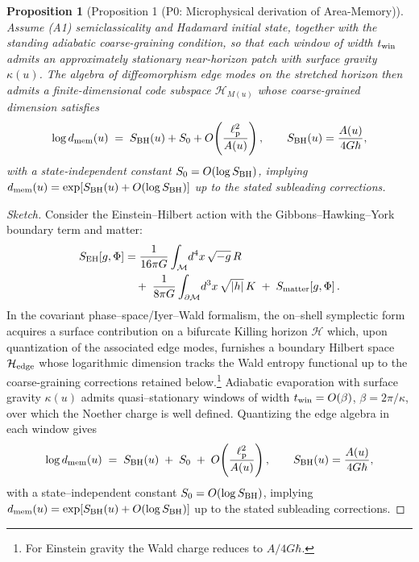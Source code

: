 \documentclass[a4paper,11pt]{article}
\theoremstyle{plain}
\newtheorem{proposition}{Proposition}
\theoremstyle{definition}
\theoremstyle{remark}
\begin{document}
\begin{proposition}[Proposition 1 (P0: Microphysical derivation of Area-Memory)]
\label{lem:P0-derivation}
\label{prop:P0-derivation}
Assume (A1) semiclassicality and Hadamard initial state, together with the standing adiabatic coarse-graining condition, so that each window of width $t_{\rm win}$
admits an approximately stationary near-horizon patch with surface gravity $\kappa(u)$. The algebra of diffeomorphism edge modes on
the stretched horizon then admits a finite-dimensional code subspace $\mathcal{H}_{M(u)}$ whose coarse-grained dimension satisfies
\[
\log d_{\rm mem}(u) \;=\; S_{\rm BH}(u) + S_0 + O\!\left(\frac{\ell_{\rm p}^2}{A(u)}\right),\qquad S_{\rm BH}(u)=\frac{A(u)}{4G\hbar},
\]
with a state-independent constant $S_0=O(\log S_{\rm BH})$, implying $d_{\rm mem}(u)=\exp[S_{\rm BH}(u)+O(\log S_{\rm BH})]$ up to the stated subleading corrections.
\end{proposition}
\begin{proof}[Sketch]
Consider the Einstein--Hilbert action with the Gibbons--Hawking--York boundary term and matter:
\begin{equation}
\begin{split}
S_{\rm EH}[g,\Phi] &= \frac{1}{16\pi G}\int_{\mathcal{M}}\!d^4x\,\sqrt{-g}\,R \\
  &\quad +\;\frac{1}{8\pi G}\int_{\partial\mathcal{M}}\!d^3x\,\sqrt{|h|}\,K\;+\;S_{\rm matter}[g,\Phi]\,.
\end{split}
\end{equation}
In the covariant phase--space/Iyer--Wald formalism, the on--shell symplectic form acquires a surface contribution on a bifurcate Killing horizon $\mathcal{H}$ which, upon quantization of the associated edge modes, furnishes a boundary Hilbert space $\mathcal{H}_{\rm edge}$ whose logarithmic dimension tracks the Wald entropy functional up to the coarse-graining corrections retained below.\footnote{For Einstein gravity the Wald charge reduces to $A/4G\hbar$.}
Adiabatic evaporation with surface gravity $\kappa(u)$ admits quasi--stationary windows of width $t_{\rm win}=O(\beta)$, $\beta=2\pi/\kappa$, over which the Noether charge is well defined. Quantizing the edge algebra in each window gives
\begin{equation}
\log d_{\rm mem}(u)\;=\;S_{\rm BH}(u)\;+\;S_0\;+\;O\!\left(\frac{\ell_{\rm p}^2}{A(u)}\right),
\qquad S_{\rm BH}(u)=\frac{A(u)}{4G\hbar},
\end{equation}
with a state--independent constant $S_0=O(\log S_{\rm BH})$, implying $d_{\rm mem}(u)=\exp[S_{\rm BH}(u)+O(\log S_{\rm BH})]$ up to the stated subleading corrections.
\end{proof}
\end{document}
